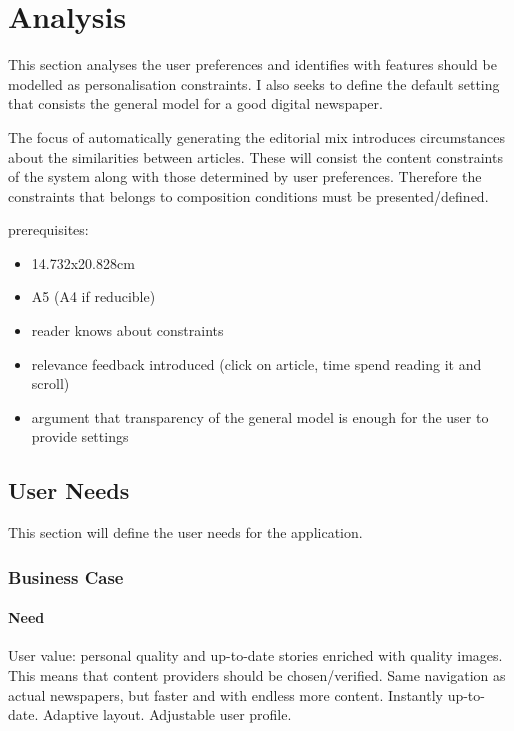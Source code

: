 \chapter{Analysis} %
\label{ch:analysis}
This section analyses the user preferences and identifies with features should be modelled as personalisation constraints. I also seeks to define the default setting that consists the general model for a good digital newspaper.

The focus of automatically generating the editorial mix introduces circumstances about the similarities between articles. These will consist the content constraints of the system along with those determined by user preferences. Therefore the constraints that belongs to composition conditions must be presented/defined.

prerequisites:
\begin{itemize}
	\item 14.732x20.828cm \cite[p. 1]{FULLTEXT01.pdf}
	\item A5 (A4 if reducible) \cite[p. 6-7]{kristin_fredrik.pdf}
	\item reader knows about constraints
	\item relevance feedback introduced (click on article, time spend reading it and scroll)
	\item argument that transparency of the general model is enough for the user to provide settings \cite[p. 7]{gervasum2001ws.pdf}
\end{itemize}

\section{User Needs}
This section will define the user needs for the application.

\subsection{Business Case}

\subsubsection{Need}
User value: personal quality and up-to-date stories enriched with quality images. This means that content providers should be chosen/verified. Same navigation as actual newspapers, but faster and with endless more content. Instantly up-to-date. Adaptive layout. Adjustable user profile.

